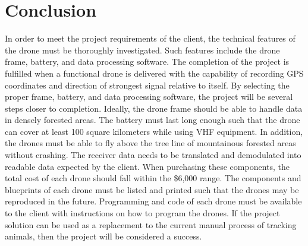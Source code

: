 \documentclass[onecolumn, draftclsnofoot,10pt, compsoc]{IEEEtran}
\begin{document}
\section{Conclusion}
In order to meet the project requirements of the client, the technical features of the drone must be thoroughly investigated. Such features include the drone frame, battery, and data processing software. The completion of the project is fulfilled when a functional drone is delivered with the capability of recording GPS coordinates and direction of strongest signal relative to itself. By selecting the proper frame, battery, and data processing software, the project will be several steps closer to completion. Ideally, the drone frame should be able to handle data in densely forested areas. The battery must last long enough such that the drone can cover at least 100 square kilometers while using VHF equipment. In addition, the drones must be able to fly above the tree line of mountainous forested areas without crashing. The receiver data needs to be translated and demodulated into readable data expected by the client. When purchasing these components, the total cost of each drone should fall within the \$6,000 range. The components and blueprints of each drone must be listed and printed such that the drones may be reproduced in the future. Programming and code of each drone must be available to the client with instructions on how to program the drones. If the project solution can be used as a replacement to the current manual process of tracking animals, then the project will be considered a success.

\nocite{*}

\end{document}
